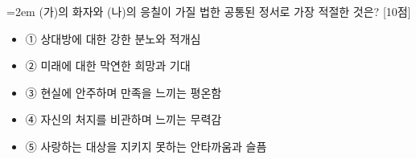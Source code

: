 \documentclass[11pt,a4paper]{article}
\newcommand{\qnum}[1]{%
  \tikz[baseline=(num.base)]{%
    \node[circle, fill=numCircle, text=white, inner sep=0pt,
          minimum size=18pt, font=\small\bfseries] (num) {#1};%
  }%
}
\newcommand{\pts}[1]{%
  \hfill\textcolor{ptsBadge}{[#1점]}%
}
\begin{document}
\vspace{4mm}
\begin{minipage}{\columnwidth}
{\hangindent=2em
\qnum{8}\enspace (가)의 화자와 (나)의 응칠이 가질 법한 공통된 정서로 가장 적절한 것은? \pts{10}
\par}

\vspace{3mm}
\begin{itemize}[leftmargin=2.5em, labelsep=0.3em, label={}, itemsep=4pt, parsep=1pt, topsep=0pt]
  \item ① 상대방에 대한 강한 분노와 적개심
  \item ② 미래에 대한 막연한 희망과 기대
  \item ③ 현실에 안주하며 만족을 느끼는 평온함
  \item ④ 자신의 처지를 비관하며 느끼는 무력감
  \item ⑤ 사랑하는 대상을 지키지 못하는 안타까움과 슬픔
\end{itemize}
\end{minipage}
\vspace{4mm}
\end{document}
